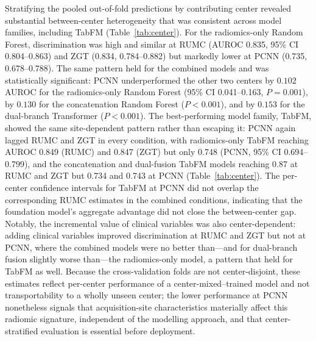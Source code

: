 \documentclass[11pt]{article}
\begin{document}
Stratifying the pooled out-of-fold predictions by contributing center revealed
substantial between-center heterogeneity that was consistent across model
families, including TabFM (Table~\ref{tab:center}). For the radiomics-only Random Forest,
discrimination was high and similar at RUMC (AUROC
0.835, 95\% CI 0.804--0.863) and ZGT (0.834, 0.784--0.882) but markedly lower at
PCNN (0.735, 0.678--0.788). The same pattern held for the combined models and was
statistically significant: PCNN underperformed the other two centers by
$0.102$ AUROC for the radiomics-only Random Forest (95\% CI 0.041--0.163,
$P=0.001$), by $0.130$ for the concatenation Random Forest
($P<0.001$), and by $0.153$ for the dual-branch Transformer ($P<0.001$). The
best-performing model family, TabFM, showed the same site-dependent pattern
rather than escaping it: PCNN again lagged RUMC and ZGT in every condition, with
radiomics-only TabFM reaching AUROC 0.849 (RUMC) and 0.847 (ZGT) but only 0.748
(PCNN, 95\% CI 0.694--0.799), and the concatenation and dual-fusion TabFM models
reaching 0.87 at RUMC and ZGT but 0.734 and 0.743 at PCNN
(Table~\ref{tab:center}). The per-center confidence intervals for TabFM at PCNN
did not overlap the corresponding RUMC estimates in the combined conditions,
indicating that the foundation model's aggregate advantage did not close the
between-center gap. Notably,
the incremental value of clinical variables was also center-dependent: adding
clinical variables improved discrimination at RUMC and ZGT but not at PCNN, where
the combined models were no better than---and for dual-branch fusion slightly
worse than---the radiomics-only model, a pattern that held for TabFM as well.
Because the cross-validation folds are not
center-disjoint, these estimates reflect per-center performance of a
center-mixed--trained model and not transportability to a wholly unseen center;
the lower performance at PCNN nonetheless signals that acquisition-site
characteristics materially affect this radiomic signature, independent of the
modelling approach, and that
center-stratified evaluation is essential before deployment.
\end{document}
